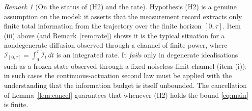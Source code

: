 \documentclass{amsart}
\theoremstyle{definition}
\theoremstyle{remark}
\newtheorem{remark}{Remark}
\begin{document}
\begin{remark}[On the status of (H2) and the rate]\label{rem:status}
Hypothesis (H2) is a genuine assumption on the model: it asserts that
the measurement record extracts only finite total information from the
trajectory over the finite horizon $[0,\tau]$. Item (iii) above (and
Remark~\ref{rem:rate}) shows it is the typical situation for a
nondegenerate diffusion observed through a channel of finite power, where
$\mathcal I_{[0,\tau]}=\int_0^\tau\dot{\mathcal I}_t\,dt$ is an
integrated rate. It \emph{fails} only in degenerate idealisations such as
a frozen state observed through a fixed noiseless-limit channel (item
(i)); in such cases the continuous-actuation second law must be applied
with the understanding that the information budget is itself unbounded.
The cancellation of Lemma~\ref{lem:cancel} guarantees that whenever (H2)
holds the bound \eqref{eq:main} is finite.
\end{remark}
\end{document}
